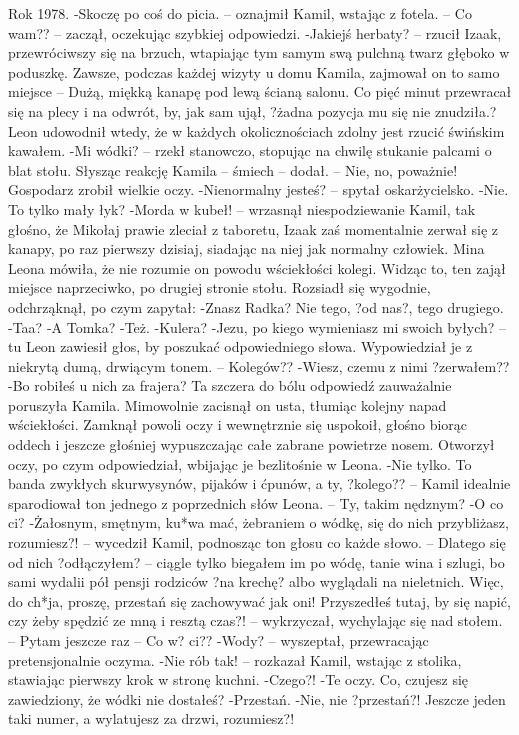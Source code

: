 \documentclass[../MAIN.tex]{subfiles}
\begin{document}
Rok 1978.
-Skoczę po coś do picia. -- oznajmił Kamil, wstając z fotela. -- Co wam?? -- zaczął, oczekując szybkiej odpowiedzi.
-Jakiejś herbaty? -- rzucił Izaak, przewróciwszy się na brzuch, wtapiając tym samym swą pulchną twarz głęboko w poduszkę. Zawsze, podczas każdej wizyty u domu Kamila, zajmował on to samo miejsce -- Dużą, miękką kanapę pod lewą ścianą salonu. Co pięć minut przewracał się na plecy i na odwrót, by, jak sam ujął, ?żadna pozycja mu się nie znudziła.?
Leon udowodnił wtedy, że w każdych okolicznościach zdolny jest rzucić świńskim kawałem.
-Mi wódki? -- rzekł stanowczo, stopując na chwilę stukanie palcami o blat stołu. Słysząc reakcję Kamila -- śmiech -- dodał. -- Nie, no, poważnie!
Gospodarz zrobił wielkie oczy.
-Nienormalny jesteś? -- spytał oskarżycielsko.
-Nie. To tylko mały łyk?
-Morda w kubeł! -- wrzasnął niespodziewanie Kamil, tak głośno, że Mikołaj prawie zleciał z taboretu, Izaak zaś momentalnie zerwał się z kanapy, po raz pierwszy dzisiaj, siadając na niej jak normalny człowiek.
Mina Leona mówiła, że nie rozumie on powodu wściekłości kolegi. Widząc to, ten zajął miejsce naprzeciwko, po drugiej stronie stołu. Rozsiadł się wygodnie, odchrząknął, po czym zapytał:
-Znasz Radka? Nie tego, ?od nas?, tego drugiego.
-Taa?
-A Tomka?
-Też.
-Kulera?
-Jezu, po kiego wymieniasz mi swoich byłych? -- tu Leon zawiesił głos, by poszukać odpowiedniego słowa. Wypowiedział je z niekrytą dumą, drwiącym tonem. -- Kolegów??
-Wiesz, czemu z nimi ?zerwałem??
-Bo robiłeś u nich za frajera?
Ta szczera do bólu odpowiedź zauważalnie poruszyła Kamila. Mimowolnie zacisnął on usta, tłumiąc kolejny napad wściekłości. Zamknął powoli oczy i wewnętrznie się uspokoił, głośno biorąc oddech i jeszcze głośniej wypuszczając całe zabrane powietrze nosem. Otworzył oczy, po czym odpowiedział, wbijając je bezlitośnie w Leona.
-Nie tylko. To banda zwykłych skurwysynów, pijaków i ćpunów, a ty, ?kolego?? -- Kamil idealnie sparodiował ton jednego z poprzednich słów Leona. -- Ty, takim nędznym?
-O co ci?
-Żałosnym, smętnym, ku*wa mać, żebraniem o wódkę, się do nich przybliżasz, rozumiesz?! -- wycedził Kamil, podnosząc ton głosu co każde słowo. -- Dlatego się od nich ?odłączyłem? -- ciągle tylko biegałem im po wódę, tanie wina i szlugi, bo sami wydalii pół pensji rodziców ?na krechę? albo wyglądali na nieletnich. Więc, do ch*ja, proszę, przestań się zachowywać jak oni! Przyszedłeś tutaj, by się napić, czy żeby spędzić ze mną i resztą czas?! -- wykrzyczał, wychylając się nad stołem. -- Pytam jeszcze raz -- Co w? ci??
-Wody? -- wyszeptał, przewracając pretensjonalnie oczyma.
-Nie rób tak! -- rozkazał Kamil, wstając z stolika, stawiając pierwszy krok w stronę kuchni.
-Czego?!
-Te oczy. Co, czujesz się zawiedziony, że wódki nie dostałeś?
-Przestań.
-Nie, nie ?przestań?! Jeszcze jeden taki numer, a wylatujesz za drzwi, rozumiesz?!
\end{document}
